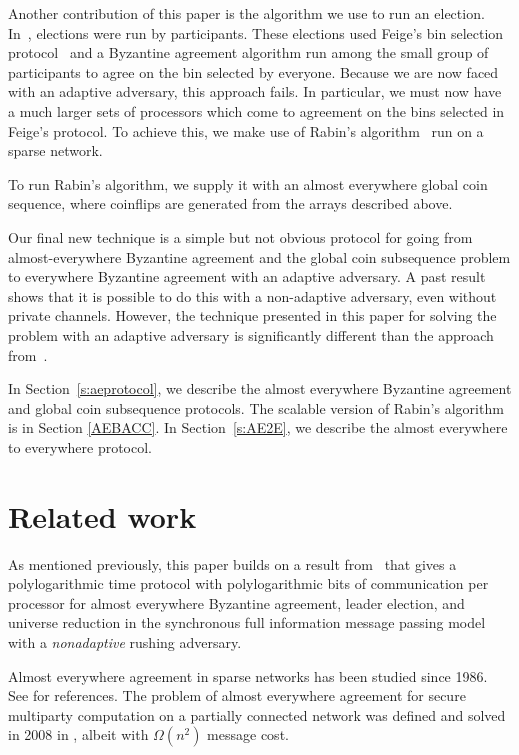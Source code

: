 \documentclass[letterpaper,11pt]{article}
\newcommand{\old}[1]{}
\begin{document}
Another contribution of this paper is the algorithm we use to run an election.  In~\cite{KSSV}, elections were run by participants.  These elections used Feige's bin selection protocol~\cite{Feige} and a Byzantine agreement algorithm run among the small group of participants to agree on the bin selected by everyone.  Because we are now faced with an adaptive adversary, this approach fails.  In particular, we must now have a much larger sets of processors which come to agreement on the bins selected in Feige's protocol.  To achieve this, we make use of Rabin's algorithm~\cite{rabin1983randomized} run on a sparse network.  
\old{To ensure that Rabin's algorithm is bandwidth efficient, not only do we run it on a sparse network, but we also}
To run Rabin's algorithm, we supply it with an almost everywhere global coin sequence, where coinflips are generated from the arrays described above.  

Our final new technique is a simple but not obvious protocol for going from almost-everywhere Byzantine agreement and the global coin subsequence problem to everywhere Byzantine agreement with an adaptive adversary.  A past result~\cite{KSDISC09} shows that it is possible to do this with a non-adaptive adversary, even without private channels.  However, the technique presented in this paper for solving the problem with an adaptive adversary is significantly different than the approach from~\cite{KSDISC09}.

 \medskip
 
In Section~\ref{s:aeprotocol}, we describe the almost everywhere Byzantine agreement  and global coin subsequence protocols. The scalable version of Rabin's algorithm is in Section \ref{AEBACC}.  In Section~\ref{s:AE2E}, we describe the almost everywhere to everywhere protocol. 

\section{Related work}

As mentioned previously, this paper builds on a result from~\cite{KSSV} that gives a polylogarithmic time protocol with polylogarithmic bits of communication per processor for almost everywhere Byzantine agreement, leader election, and universe reduction in the synchronous full information message passing model with a \emph{nonadaptive} rushing adversary. 
 
Almost everywhere agreement in sparse networks has been studied since 1986. See \cite{KSSV,KSSV2} for references. The problem of almost everywhere agreement for secure multiparty computation on a partially connected network was defined and solved in 2008 in \cite{GO}, albeit with $\Omega(n^{2})$ message cost.
\end{document}

